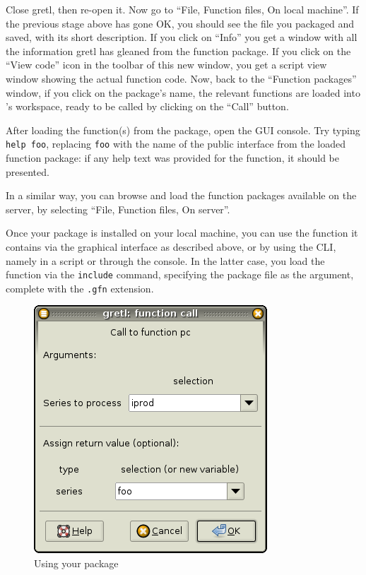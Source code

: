Close gretl, then re-open it.  Now go to ``File, Function files, On
local machine''. If the previous stage above has gone OK, you should
see the file you packaged and saved, with its short description.  If
you click on ``Info'' you get a window with all the information gretl
has gleaned from the function package.  If you click on the ``View
code'' icon in the toolbar of this new window, you get a script view
window showing the actual function code. Now, back to the ``Function
packages'' window, if you click on the package's name, the relevant
functions are loaded into 's workspace, ready to be called
by clicking on the ``Call'' button.

After loading the function(s) from the package, open the GUI console.
Try typing \texttt{help foo}, replacing \texttt{foo} with the name of
the public interface from the loaded function package: if any help text
was provided for the function, it should be presented.

In a similar way, you can browse and load the function packages
available on the  server, by selecting ``File, Function
files, On server''.

Once your package is installed on your local machine, you can use the
function it contains via the graphical interface as described above,
or by using the CLI, namely in a script or through the console. In the
latter case, you load the function via the \texttt{include} command,
specifying the package file as the argument, complete with the
\texttt{.gfn} extension.

\begin{figure}[htbp]
  \centering
  \includegraphics[scale=0.5]{figures/function_call}
  \caption{Using your package}
  \label{fig:function_call}
\end{figure}

